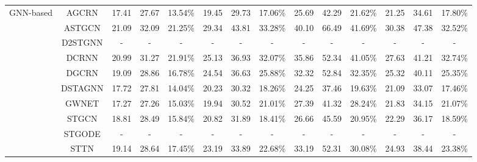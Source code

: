 \begin{table}[t]
{\begin{tabular}{c|c|c|c|c|c|c|c|c|c|c|c|c|c}
\midrule
\multirow{10}{*}{GNN-based} & AGCRN & 17.41 & 27.67 & 13.54\% & 19.45 & 29.73 & 17.06\% & 25.69 & 42.29 & 21.62\% & 21.25 & 34.61 & 17.80\% \\
 & ASTGCN & 21.09 & 32.09 & 21.25\% & 29.34 & 43.81 & 33.28\% & 40.10 & 66.49 & 41.69\% & 30.38 & 47.38 & 32.52\% \\
 & D2STGNN & - & - & - & - & - & - & - & - & - & - & - & - \\
 & DCRNN & 20.99 & 31.27 & 21.91\% & 25.13 & 36.93 & 32.07\% & 35.86 & 52.34 & 41.05\% & 27.63 & 41.21 & 32.74\% \\
 & DGCRN & 19.09 & 28.86 & 16.78\% & 24.54 & 36.63 & 25.88\% & 32.32 & 52.84 & 32.35\% & 25.32 & 40.11 & 25.35\% \\
 & DSTAGNN & 17.72 & 27.81 & 14.04\% & 20.23 & 30.32 & 18.26\% & 24.25 & 37.46 & 19.63\% & 21.09 & 33.07 & 17.46\% \\
 & GWNET & 17.27 & 27.26 & 15.03\% & 19.94 & 30.52 & 21.01\% & 27.39 & 41.32 & 28.24\% & 21.83 & 34.15 & 21.07\% \\
 & STGCN & 18.81 & 28.49 & 15.84\% & 20.82 & 31.89 & 18.41\% & 26.66 & 45.59 & 20.95\% & 22.29 & 36.17 & 18.59\% \\
 & STGODE & - & - & - & - & - & - & - & - & - & - & - & - \\
 & STTN & 19.14 & 28.64 & 17.45\% & 23.19 & 33.89 & 22.68\% & 33.19 & 52.31 & 30.08\% & 24.93 & 38.44 & 23.38\% \\
\bottomrule
\end{tabular}
}
\end{table}

